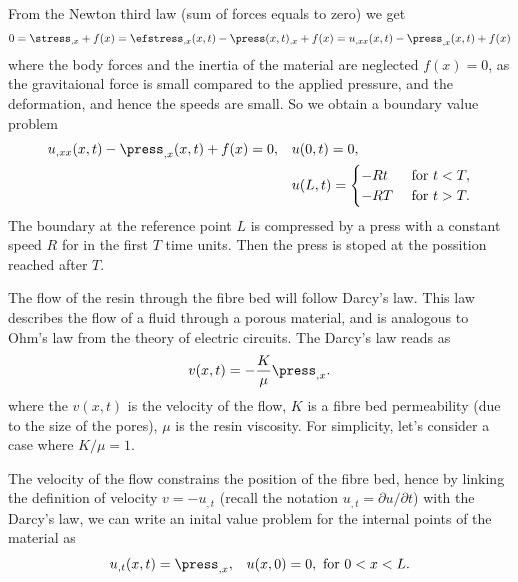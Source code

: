 \documentclass[twoside,a4paper,12pt]{article}
\newcommand{\note}[1]{{\color{red}(#1)}}
\begin{document}
From the Newton third law (sum of forces equals to zero) we get
%
\begin{align}
  0 =
  \stress_{,x} + f(x) =
  \efstress_{,x}(x,t) - \press(x,t)_{,x} + f(x) =
  u_{,xx}(x,t) - \press_{,x}(x,t) + f(x) 
\end{align}
%
where the body forces and the inertia of the material are neglected
$f(x) = 0$, as the gravitaional force is small compared to the applied
pressure, and the deformation, and hence the speeds are small.
%
So we obtain a boundary value problem
%
\begin{align}
  u_{,xx}(x,t) - \press_{,x}(x,t) + f(x) \label{eq:bvp-flow}
  = 0 , &&& u(0,t) = 0,\\\nonumber
        &&&u(L,t) =
            \begin{cases}
              -Rt &\text{ for } t < T,\\
              -RT &\text{ for } t > T.
            \end{cases} 
\end{align}
%
The boundary at the reference point $L$ is compressed by a press with
a constant speed $R$ for in the first $T$ time units. Then the press
is stoped at the possition reached after $T$.

%

The flow of the resin through the fibre bed will follow Darcy's law.
This law describes the flow of a fluid through a porous material, and
is analogous to Ohm's law from the theory of electric circuits. The
Darcy's law reads as
%
\begin{align}
  v(x,t) = -\frac{K}{\mu} \press_{,x}. \label{eq:darcy}
\end{align}
where the $v(x,t)$ is the velocity of the flow, $K$ is a fibre bed
permeability (due to the size of the pores),
%
%
$\mu$ is the resin viscosity.
%
%
For simplicity, let's consider a case where $K/\mu=1$.
%

The velocity of the flow constrains the position of the fibre bed,
hence by linking the definition of velocity $v = - u_{,t}$ (recall the
notation $u_{,t} = \partial u/\partial t$) with the Darcy's law, we
can write an inital value problem for the internal points of the
material as
%
\begin{align}
  u_{,t}(x,t) =  \press_{,x} , && u(x,0) = 0 , \text{ for } 0 < x < L. \label{eq:velocity}
\end{align}
\end{document}

